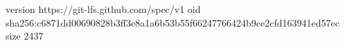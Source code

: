version https://git-lfs.github.com/spec/v1
oid sha256:c6871dd00690828b3ff3e8a1a6b53b55f66247766424b9ce2cfd163941ed57ec
size 2437
